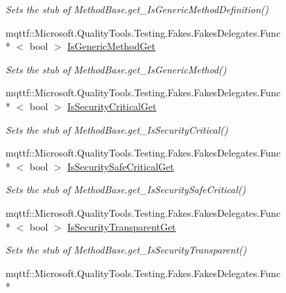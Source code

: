 \begin{DoxyCompactItemize}
\begin{DoxyCompactList}\small\item\em Sets the stub of Method\-Base.\-get\-\_\-\-Is\-Generic\-Method\-Definition()\end{DoxyCompactList}\item 
mqttf\-::\-Microsoft.\-Quality\-Tools.\-Testing.\-Fakes.\-Fakes\-Delegates.\-Func\\*
$<$ bool $>$ \hyperlink{class_system_1_1_reflection_1_1_fakes_1_1_stub_method_info_abf9013e316d58601b37fff5277b9ff15}{Is\-Generic\-Method\-Get}
\begin{DoxyCompactList}\small\item\em Sets the stub of Method\-Base.\-get\-\_\-\-Is\-Generic\-Method()\end{DoxyCompactList}\item 
mqttf\-::\-Microsoft.\-Quality\-Tools.\-Testing.\-Fakes.\-Fakes\-Delegates.\-Func\\*
$<$ bool $>$ \hyperlink{class_system_1_1_reflection_1_1_fakes_1_1_stub_method_info_ac7db65702f5bef7fe9940bda2afbfaf3}{Is\-Security\-Critical\-Get}
\begin{DoxyCompactList}\small\item\em Sets the stub of Method\-Base.\-get\-\_\-\-Is\-Security\-Critical()\end{DoxyCompactList}\item 
mqttf\-::\-Microsoft.\-Quality\-Tools.\-Testing.\-Fakes.\-Fakes\-Delegates.\-Func\\*
$<$ bool $>$ \hyperlink{class_system_1_1_reflection_1_1_fakes_1_1_stub_method_info_a46e999acc3f8932f7d95098acc0302fd}{Is\-Security\-Safe\-Critical\-Get}
\begin{DoxyCompactList}\small\item\em Sets the stub of Method\-Base.\-get\-\_\-\-Is\-Security\-Safe\-Critical()\end{DoxyCompactList}\item 
mqttf\-::\-Microsoft.\-Quality\-Tools.\-Testing.\-Fakes.\-Fakes\-Delegates.\-Func\\*
$<$ bool $>$ \hyperlink{class_system_1_1_reflection_1_1_fakes_1_1_stub_method_info_a091f5e9aff7ec68affae347c9143781b}{Is\-Security\-Transparent\-Get}
\begin{DoxyCompactList}\small\item\em Sets the stub of Method\-Base.\-get\-\_\-\-Is\-Security\-Transparent()\end{DoxyCompactList}\item 
mqttf\-::\-Microsoft.\-Quality\-Tools.\-Testing.\-Fakes.\-Fakes\-Delegates.\-Func\\*

\end{DoxyCompactItemize}
